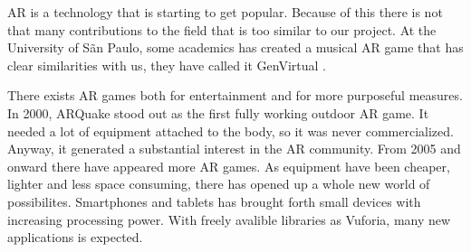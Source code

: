 \gls{AR} is a technology that is starting to get popular. Because of this there
is not that many contributions to the field that is too similar to our project.
At the University of S\~{a}n Paulo, some academics has created a musical AR game
that has clear similarities with us, they have called it GenVirtual
\cite{GenVirtual}. 

There exists AR games both for entertainment and for more purposeful
measures\cite{tan2010augmented}. In 2000, ARQuake stood out as the first fully
working outdoor AR game. It needed a lot of equipment attached to the body, so
it was never commercialized. Anyway, it generated a substantial interest in the
AR community. From 2005 and onward there have appeared more AR games. As
equipment have been cheaper, lighter and less space consuming, there has opened
up a whole new world of possibilites. Smartphones and tablets has brought forth
small devices with increasing processing power. With freely avalible libraries
as \gls{Vuforia}, many new applications is expected.
